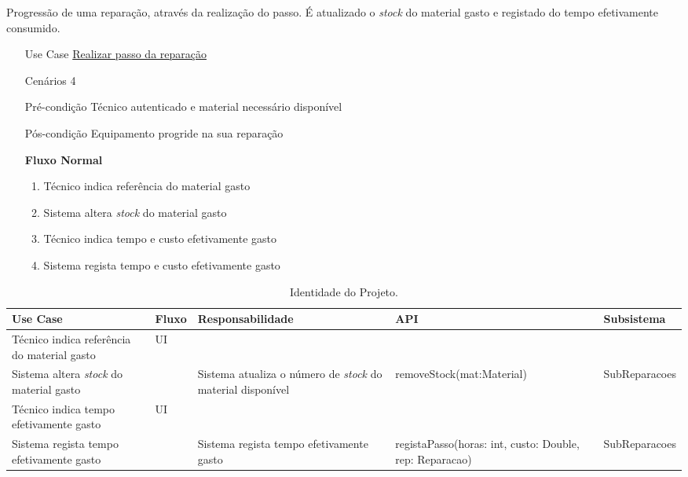 \documentclass[../relatorio.tex]{subfiles}
\begin{document}
Progressão de uma reparação, através da realização do passo.
É atualizado o \textit{stock} do material gasto e registado do tempo efetivamente consumido.
\begin{itemize}
    \item[Use Case] {\underline{Realizar passo da reparação}}
    \item[Cenários] {4}
    \item[Pré-condição] {Técnico autenticado e material necessário disponível}
    \item[Pós-condição] {Equipamento progride na sua reparação}
          \begin{flushleft}
              \textbf{Fluxo Normal}
          \end{flushleft}
          \begin{enumerate}
              \item Técnico indica referência do material gasto
              \item Sistema altera \textit{stock} do material gasto
              \item Técnico indica tempo e custo efetivamente gasto 
              \item Sistema regista tempo e custo efetivamente gasto
          \end{enumerate}
\end{itemize}

\begin{landscape}
    \begin{table}[!h]
        \centering
        \begin{tabular}{|p{5cm}|p{1cm}|p{4cm}|p{6cm}|p{3cm}|}
            \hline
            \rowcolor{gray!20!white}
            Use Case & Fluxo & Responsabilidade & API & Subsistema \\
            \hline
            \rowcolor{yellow}
            Técnico indica referência do material gasto
                     & UI
                     &
                     &
                     &
            \\
            \hline
            Sistema altera \textit{stock} do material gasto
                     & 
                     & Sistema atualiza o número de \textit{stock} do material disponível
                     & removeStock(mat:Material)
                     & SubReparacoes
            \\
            \hline
            \rowcolor{yellow}
            Técnico indica tempo efetivamente gasto
                     & UI
                     &
                     &
                     &
            \\
            \hline
            Sistema regista tempo efetivamente gasto
                     &
                     & Sistema regista tempo efetivamente gasto
                     & registaPasso(horas: int, custo: Double, rep: Reparacao)
                     & SubReparacoes
            \\
            \hline
        \end{tabular}
        \caption{Identidade do Projeto.}
    \end{table}
\end{landscape}
\end{document}
